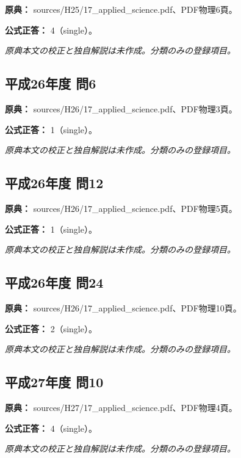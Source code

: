 \noindent\textbf{原典：} sources/H25/17\_applied\_science.pdf、PDF物理6頁。

\textbf{公式正答：} 4（single）。

\par\textit{原典本文の校正と独自解説は未作成。分類のみの登録項目。}

\subsection{平成26年度 問6}
\label{q:h26-reg-applied-06}

\noindent\textbf{原典：} sources/H26/17\_applied\_science.pdf、PDF物理3頁。

\textbf{公式正答：} 1（single）。

\par\textit{原典本文の校正と独自解説は未作成。分類のみの登録項目。}

\subsection{平成26年度 問12}
\label{q:h26-reg-applied-12}

\noindent\textbf{原典：} sources/H26/17\_applied\_science.pdf、PDF物理5頁。

\textbf{公式正答：} 1（single）。

\par\textit{原典本文の校正と独自解説は未作成。分類のみの登録項目。}

\subsection{平成26年度 問24}
\label{q:h26-reg-applied-24}

\noindent\textbf{原典：} sources/H26/17\_applied\_science.pdf、PDF物理10頁。

\textbf{公式正答：} 2（single）。

\par\textit{原典本文の校正と独自解説は未作成。分類のみの登録項目。}

\subsection{平成27年度 問10}
\label{q:h27-reg-applied-10}

\noindent\textbf{原典：} sources/H27/17\_applied\_science.pdf、PDF物理4頁。

\textbf{公式正答：} 4（single）。

\par\textit{原典本文の校正と独自解説は未作成。分類のみの登録項目。}

